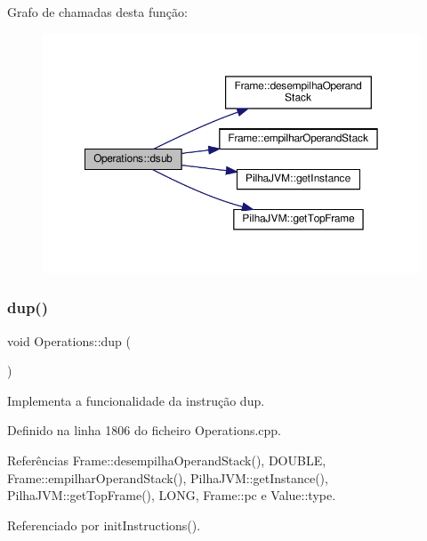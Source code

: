 Grafo de chamadas desta função\+:
\nopagebreak
\begin{figure}[H]
\begin{center}
\leavevmode
\includegraphics[width=350pt]{classOperations_aa994b0cf4aead2646fa5bb90c2643664_cgraph}
\end{center}
\end{figure}
\mbox{\label{classOperations_a0cba4ff895f2e3908eea5b39305481a4}} 
\subsubsection{\texorpdfstring{dup()}{dup()}}
{\footnotesize\ttfamily void Operations\+::dup (\begin{DoxyParamCaption}{ }\end{DoxyParamCaption})\hspace{0.3cm}{\ttfamily [private]}}



Implementa a funcionalidade da instrução dup. 



Definido na linha 1806 do ficheiro Operations.\+cpp.



Referências Frame\+::desempilha\+Operand\+Stack(), D\+O\+U\+B\+LE, Frame\+::empilhar\+Operand\+Stack(), Pilha\+J\+V\+M\+::get\+Instance(), Pilha\+J\+V\+M\+::get\+Top\+Frame(), L\+O\+NG, Frame\+::pc e Value\+::type.



Referenciado por init\+Instructions().

